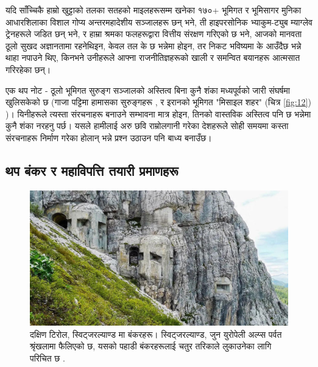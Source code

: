 \documentclass[10pt,twocolumn,letterpaper]{article}
\begin{document}
यदि साँच्चिकै हाम्रो खुट्टाको तलका सतहको माइलहरूसम्म खनेका १७०+ भूमिगत र भूमिसागर मुनिका आधारशिलाका विशाल गोप्य अन्तरमहादेशीय सञ्जालहरू छन् भने, ती हाइपरसोनिक भ्याकुम-ट्युब म्याग्लेव ट्रेनहरूले जडित छन् भने, र हाम्रा श्रमका फलहरूद्वारा वित्तीय संरक्षण गरिएको छ भने, आजको मानवता ठूलो सुखद अज्ञानतामा रहनेथिइन, केवल तल के छ भन्नेमा होइन, तर निकट भविष्यमा के आउँदैछ भन्ने थाहा नपाउने थिए, किनभने उनीहरूले आफ्ना राजनीतिज्ञहरूको खाली र समन्वित बयानहरू आत्मसात गरिरहेका छन्।

एक थप नोट - ठूलो भूमिगत सुरुङ्ग सञ्जालको अस्तित्व बिना कुनै शंका मध्यपूर्वको जारी संघर्षमा खुलिसकेको छ (गाजा पट्टिमा हामासका सुरुङ्गहरू \cite{38}, र इरानको भूमिगत "मिसाइल शहर" (चित्र \ref{fig:12}) \cite{39,40})। यिनीहरूले त्यस्ता संरचनाहरू बनाउने सम्भावना मात्र होइन, तिनको वास्तविक अस्तित्व पनि छ भन्नेमा कुनै शंका नरहनु पर्छ। यसले हामीलाई अरु छवि राम्रोलगानी गरेका देशहरूले सोही समयमा कस्ता संरचनाहरू निर्माण गरेका होलान् भन्ने प्रश्न उठाउन पनि बाध्य बनाउँछ।

\subsection{थप बंकर र महाविपत्ति तयारी प्रमाणहरू}

\begin{figure}[t]
\begin{center}

\includegraphics[width=1\linewidth]{tyrol.jpg}
\end{center}
   \caption{दक्षिण टिरोल, स्विट्जरल्याण्ड मा बंकरहरू। स्विट्जरल्याण्ड, जुन युरोपेली अल्प्स पर्वत श्रृंखलामा फैलिएको छ, यसको पहाडी बंकरहरूलाई चतुर तरिकाले लुकाउनेका लागि परिचित छ \cite{32}.}
\label{fig:7}
\label{fig:onecol}
\end{figure}
\end{document}

